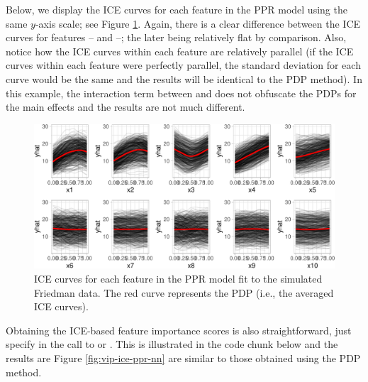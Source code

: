 Below, we display the ICE curves for each feature in the PPR model using
the same \(y\)-axis scale; see Figure \ref{fig:ice-ppr}. Again, there is
a clear difference between the ICE curves for features
-- and --; the later being
relatively flat by comparison. Also, notice how the ICE curves within
each feature are relatively parallel (if the ICE curves within each
feature were perfectly parallel, the standard deviation for each curve
would be the same and the results will be identical to the PDP method).
In this example, the interaction term between  and 
does not obfuscate the PDPs for the main effects and the results are not
much different.

\begin{Schunk}
\begin{figure}[!htb]

{\centering \includegraphics[width=1\linewidth]{greenwell-boehmke_files/figure-latex/ice-ppr-1} 

}

\caption[ICE curves for each feature in the PPR model fit to the simulated Friedman data]{ICE curves for each feature in the PPR model fit to the simulated Friedman data. The red curve represents the PDP (i.e., the averaged ICE curves).}\label{fig:ice-ppr}
\end{figure}
\end{Schunk}

Obtaining the ICE-based feature importance scores is also
straightforward, just specify  in the call to
 or . This is illustrated in the code
chunk below and the results are Figure \ref{fig:vip-ice-ppr-nn} are
similar to those obtained using the PDP method.

